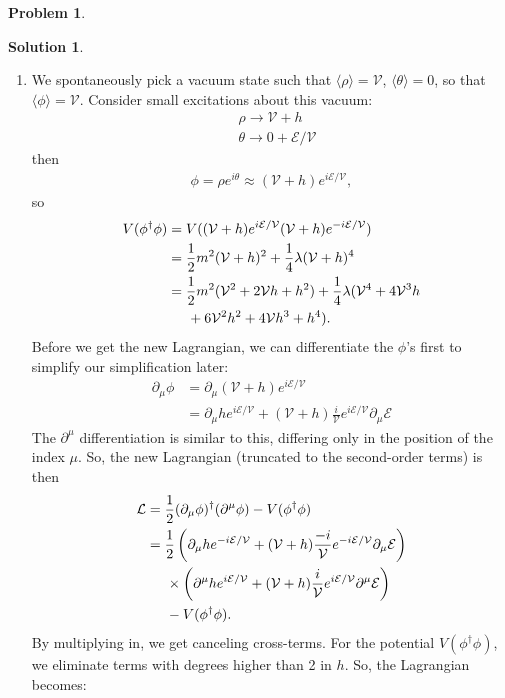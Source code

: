 \documentclass[a4paper,11pt]{article}
\numberwithin{equation}{section}
\theoremstyle{definition}
\newtheorem{prob}{Problem}[section]
\newtheorem{sln}{Solution}[section]
\newcommand{\p}{\partial}
\newcommand{\lag}{\mathcal{L}}
\newcommand{\E}{\mathcal{E}}
\newcommand{\V}{\mathcal{V}}
\begin{document}
\begin{prob}
\begin{sln}
\begin{enumerate}
			\item We spontaneously pick a vacuum state such that $\langle\rho\rangle = \V$, $\langle \theta \rangle = 0$, so that $\langle \phi \rangle = \V$. Consider small excitations about this vacuum: 
			\begin{align}
			&\rho \to \V + h\\
			&\theta \to 0 + \E/\V
			\end{align} 
			then
			\begin{align}
			\phi = \rho e^{i\theta} \approx (\V+h)e^{i\E/\V},
			\end{align}
			so
			\begin{align}
			V(\phi^\dagger\phi) &= V((\V+h)e^{i\E/\V}(\V+h)e^{-i\E/\V})\nonumber\\
			&= \frac{1}{2}m^2(\V + h)^2 + \frac{1}{4}\lambda(\V+h)^4\nonumber\\
			&= \frac{1}{2}m^2(\V^2 + 2\V h + h^2) + \frac{1}{4}\lambda(\V^4 + 4\V^3h\nonumber\\
			&\hspace{0.5cm}+ 6\V^2h^2 + 4\V h^3 + h^4).
			\end{align}
			Before we get the new Lagrangian, we can differentiate the $\phi$'s first to simplify our simplification later:
			\begin{align}
			\p_\mu \phi &= \p_\mu (\V + h)e^{i\E/\V}\nonumber\\
			&= \p_\mu h e^{i\E/\V} + (\V + h)\frac{i}{\V}e^{i\E/\V}\p_\mu\E
			\end{align}
			The $\p^\mu$ differentiation is similar to this, differing only in the position of the index $\mu$. So, the new Lagrangian (truncated to the second-order terms) is then
			\begin{align}
			\lag &= \frac{1}{2}(\p_\mu\phi)^\dagger(\p^\mu \phi) - V(\phi^\dagger\phi)\nonumber\\
			&= \frac{1}{2}\left(\p_\mu h e^{-i\E/\V} + (\V + h)\frac{-i}{\V}e^{-i\E/\V}\p_\mu\E\right)\nonumber\\
			&\hspace{0.5cm}\times \left(\p^\mu h e^{i\E/\V} + (\V + h)\frac{i}{\V}e^{i\E/\V}\p^\mu\E\right)\nonumber\\
			&\hspace{0.5cm} - V(\phi^\dagger\phi).
			\end{align}
			By multiplying in, we get canceling cross-terms. For the potential $V(\phi^\dagger\phi)$, we eliminate terms with degrees higher than 2 in $h$. So, the Lagrangian becomes:
			\begin{align}

\end{align}
\end{enumerate}
\end{sln}
\end{prob}
\end{document}
